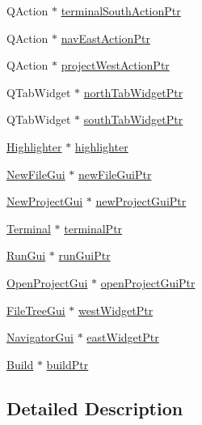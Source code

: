 \begin{DoxyCompactItemize}
Q\-Action $\ast$ \hyperlink{class_master_actions_ad96c9f17230e162e9a9f39a867101a53}{terminal\-South\-Action\-Ptr}
\item 
Q\-Action $\ast$ \hyperlink{class_master_actions_aa084a718ec328fbb6645bdb23c995df1}{nav\-East\-Action\-Ptr}
\item 
Q\-Action $\ast$ \hyperlink{class_master_actions_aa4160469d2e9a840448c49e95bcfa9e5}{project\-West\-Action\-Ptr}
\item 
Q\-Tab\-Widget $\ast$ \hyperlink{class_master_actions_a4fbb50c5700fd6b66ace4cff6d3bde3e}{north\-Tab\-Widget\-Ptr}
\item 
Q\-Tab\-Widget $\ast$ \hyperlink{class_master_actions_ae50dea40859da966d8b8a27d2069f6d7}{south\-Tab\-Widget\-Ptr}
\item 
\hyperlink{class_highlighter}{Highlighter} $\ast$ \hyperlink{class_master_actions_a50b1565db8b7780ec4e88e59953aa67b}{highlighter}
\item 
\hyperlink{class_new_file_gui}{New\-File\-Gui} $\ast$ \hyperlink{class_master_actions_a8839c174acf071c0d9bfe450160218eb}{new\-File\-Gui\-Ptr}
\item 
\hyperlink{class_new_project_gui}{New\-Project\-Gui} $\ast$ \hyperlink{class_master_actions_a78733336a3d5fd3bbb55eaf0215f0d40}{new\-Project\-Gui\-Ptr}
\item 
\hyperlink{class_terminal}{Terminal} $\ast$ \hyperlink{class_master_actions_accb886e749ad46cb6373187e59921bcf}{terminal\-Ptr}
\item 
\hyperlink{class_run_gui}{Run\-Gui} $\ast$ \hyperlink{class_master_actions_ad7ff295f2e3067697e290afc4f0fd0df}{run\-Gui\-Ptr}
\item 
\hyperlink{class_open_project_gui}{Open\-Project\-Gui} $\ast$ \hyperlink{class_master_actions_a6caf7325dd9cb26f72c81a8c877db634}{open\-Project\-Gui\-Ptr}
\item 
\hyperlink{class_file_tree_gui}{File\-Tree\-Gui} $\ast$ \hyperlink{class_master_actions_a84f8a14213e1f05a00f1855b41a973de}{west\-Widget\-Ptr}
\item 
\hyperlink{class_navigator_gui}{Navigator\-Gui} $\ast$ \hyperlink{class_master_actions_a24c61c608d67e766f996d3a430a7bae0}{east\-Widget\-Ptr}
\item 
\hyperlink{class_build}{Build} $\ast$ \hyperlink{class_master_actions_a204854f9bf284e221292497cdb7182ab}{build\-Ptr}
\end{DoxyCompactItemize}


\subsection{Detailed Description}


